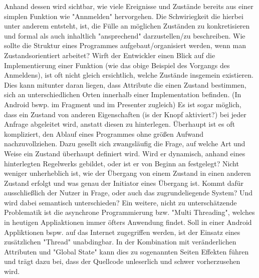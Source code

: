 Anhand dessen wird sichtbar, wie viele Ereignisse und Zustände bereits aus einer simplen Funktion wie "Annmelden" hervorgehen.
Die Schwiriegkeit die hierbei unter anderem entsteht, ist, die Fülle an möglichen Zuständen zu konkretisieren und 
formal als auch inhaltlich "ansprechend" darzustellen/zu beschreiben.
Wie sollte die Struktur eines Programmes aufgebaut/organisiert werden, wenn man Zustandsorientiert arbeitet?
Wirft der Entwickler einen Blick auf die Implementierung  einer Funktion (wie das obige Beispiel des Vorgangs des Anmeldens), 
ist oft nicht gleich ersichtlich, welche Zustände insgemein existieren.
Dies kann mitunter daran liegen, dass Attribute die einen Zustand bestimmen, sich an unterschiedlichen Orten innerhalb
einer Implementation befinden. (In Android bswp. im Fragment und im Presenter zugleich)
Es ist sogar möglich, dass ein Zustand von anderen Eigenschaften (is der Knopf aktiviert?) bei jeder Anfrage abgeleitet wird,
anstatt diesen zu hinterlegen.
Überhaupt ist es oft kompliziert, den Ablauf eines Programmes ohne größen Aufwand nachzuvollziehen.
Dazu gesellt sich zwangsläufig die Frage, auf welche Art und Weise ein Zustand überhaupt definiert wird. 
Wird er dynamisch, anhand eines hinterlegten Regelwerks gebildet, oder ist er von Beginn an festgelegt?
Nicht weniger unherheblich ist, wie der Übergang von einem Zustand in einen anderen Zustand erfolgt und was 
genau der Initiator eines Übergang ist.
Kommt dafür ausschließlich der Nutzer in Frage, oder auch das zugrundeliegende System? Und wird dabei semantisch  unterschieden? 
Ein weitere, nicht zu unterschätzende Problematik ist die asynchrone Programmierung bzw. "Multi Threading",
welches in heutigen Appliaktionen immer öfters Anwendung findet. Soll in einer Android Appliktionen bspw. auf das Internet
zugegriffen werden, ist der Einsatz eines zusätzlichen "Thread" un­ab­ding­bar.
In der Kombination mit veränderlichen Attributen und "Global State" kann dies zu sogenannten Seiten Effekten führen und trägt dazu bei, 
dass der Quellcode unleserlich und schwer vorherzusehen wird.




% 



